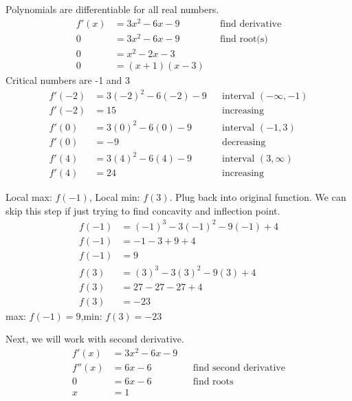 \documentclass{article}
\begin{document}
\begin{description}
\begin{description}
                Polynomials are differentiable for all real numbers.
                \begin{align*}
                  f'(x) & = 3x^2-6x - 9     &  & \text{find derivative} \\[2em]
                  0     & = 3x^2-6x - 9     &  & \text{find root(s)}    \\
                  0     & = x^2-2x - 3                                  \\
                  0     & = (x + 1) (x - 3)
                \end{align*}
                Critical numbers are -1 and 3
                \begin{align*}
                  f'(-2) & = 3(-2)^2-6(-2) - 9 &  & \text{interval $(-\infty, -1)$} \\
                  f'(-2) & = 15                &  & \text{increasing}               \\[2em]
                  f'(0)  & = 3(0)^2-6(0) - 9   &  & \text{interval $(-1, 3)$}       \\
                  f'(0)  & = -9                &  & \text{decreasing}               \\[2em]
                  f'(4)  & = 3(4)^2-6(4) - 9   &  & \text{interval $(3, \infty)$}   \\
                  f'(4)  & = 24                &  & \text{increasing}
                \end{align*}

                Local max: $f(-1)$, Local min: $f(3)$. Plug back into original function. We can
                skip this step if just trying to find concavity and inflection point.
                \begin{align*}
                  f(-1) & = (-1)^3-3(-1)^2 - 9(-1) + 4 \\
                  f(-1) & = -1 - 3 + 9 + 4             \\
                  f(-1) & = 9                          \\[2em]
                  f(3)  & = (3)^3-3(3)^2 - 9(3) + 4    \\
                  f(3)  & = 27 - 27 - 27 + 4           \\
                  f(3)  & = -23
                \end{align*}
                max: $f(-1) = 9$,\space min: $f(3) = -23$

                Next, we will work with second derivative.
                \begin{align*}
                  f'(x)  & = 3x^2-6x - 9                                    \\
                  f''(x) & = 6x - 6      &  & \text{find second derivative} \\[2em]
                  0      & = 6x - 6      &  & \text{find roots}             \\
                  x      & = 1
                \end{align*}


\end{description}
\end{description}
\end{document}
